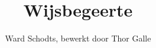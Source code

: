 \documentclass[11pt,a4paper]{article}
\begin{document}
\title{\huge Wijsbegeerte}
\author{Ward Schodts, bewerkt door Thor Galle}
\date{}
\maketitle





\end{document}
